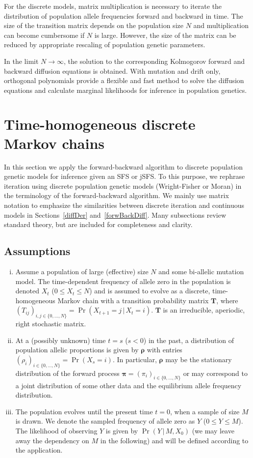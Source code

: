 \documentclass[preprint]{elsarticle}
\newcommand{\bs}[1]{\ensuremath{\boldsymbol{#1}}}
\newcommand\given{{\,|\,}}
\newcommand\x[1]{\ensuremath{X_{#1}}}
\newcommand\y{\ensuremath{Y}}
\newcommand\s{\ensuremath{s}}
\begin{document}
For the discrete models, matrix multiplication is necessary to iterate the distribution of population allele frequencies forward and backward in time. The size of the transition matrix depends on the population size $N$ and multiplication can become cumbersome if $N$ is large. However, the size of the matrix can be reduced by appropriate rescaling of population genetic parameters.

In the limit $N\to\infty$, the solution to the corresponding Kolmogorov forward and backward diffusion equations is obtained. With mutation and drift only, orthogonal polynomials provide a flexible and fast method to solve the diffusion equations and calculate marginal likelihoods for inference in population genetics.

\section{Time-homogeneous discrete Markov chains}

In this section we apply the forward-backward algorithm to discrete population genetic models for inference given an SFS or jSFS. To this purpose, we rephrase iteration using discrete population genetic models (Wright-Fisher or Moran) in the terminology of the forward-backward algorithm. We mainly use matrix notation to emphasize the similarities between discrete iteration and continuous models in Sections~\ref{diffDer} and~\ref{forwBackDiff}. Many subsections review standard theory, but are included for completeness and clarity. 

\subsection{Assumptions}\label{section:assumptions}
\begin{enumerate}[(i)]
\item Assume a population of large (effective) size $N$ and some bi-allelic mutation model. The time-dependent frequency of allele zero in the population is denoted $\x{t}$ ($0 \le \x{t} \le N$) and is assumed to evolve as a discrete, time-homogeneous Markov chain with a transition probability matrix $\mathbf{T}$, where $(T_{ij})_{i,j \in \{0, \ldots, N\}} = \Pr(\x{t+1}=j \given \x{t}=i)$. $\mathbf{T}$ is an irreducible, aperiodic, right stochastic matrix.
\item At a (possibly unknown) time $t=\s$ ($\s<0$) in the past, a distribution of population allelic proportions is given by $\bs{\rho}$ with entries $(\rho_{i})_{i \in \{0, \ldots, N\}} = \Pr(\x{\s}=i)$.  In particular, $\bs{\rho}$ may be the stationary distribution of the forward process $\bs{\pi}=(\pi_i)_{i \in \{0, \ldots, N\}}$ or may correspond to a joint distribution of some other data and the equilibrium allele frequency distribution. 
\item The population evolves until the present time $t=0$, when a sample of size $M$ is drawn.  We denote the sampled frequency of allele zero as $\y$ ($0 \le \y \le M$). The likelihood of observing $\y$ is given by $\Pr(\y \given M, \x{0})$ (we may leave away the dependency on $M$ in the following) and will be defined according to the application.
\end{enumerate}
\end{document}
